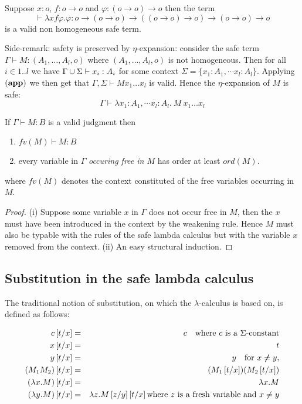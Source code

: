 \begin{exmp}
Suppose $x:o$, $f:o\rightarrow o$ and $\varphi:(o\rightarrow
o)\rightarrow o$ then the term $$\vdash \lambda x f \varphi .
\varphi : o \rightarrow (o\rightarrow o) \rightarrow ((o\rightarrow
o)\rightarrow o) \rightarrow (o\rightarrow o)\rightarrow o$$ is
a valid non homogeneous safe term.
\end{exmp}

Side-remark: safety is preserved by $\eta$-expansion: consider the safe term
$\Gamma \vdash M:(A_1,\ldots,A_l,o)$ where $(A_1,\ldots,A_l,o)$ is not homogeneous. Then for all $i \in 1..l$ we have $\Gamma \cup \Sigma \vdash x_i :A_i$ for some
context $\Sigma = \{ x_1:A_1, \cdots x_l :A_l \}$. Applying $\mathbf{(app)}$ we then get that $\Gamma, \Sigma \vdash M x_1 \ldots x_l$ is valid. Hence
the $\eta$-expansion of $M$ is safe:
$$\Gamma \vdash \lambda x_1:A_1, \cdots x_l:A_l .\ M\ x_1 \ldots x_l$$


\begin{lem}
\label{lem:nonhomosafe_basic_prop}
If $\Gamma \vdash M : B$ is a valid judgment then
\begin{enumerate}
\item $fv(M) \vdash M : B$
\item every variable in $\Gamma$ \emph{occuring free in $M$} has order at
least $ord(M)$.
\end{enumerate}
where $fv(M)$ denotes the context constituted of the free variables occurring in $M$.
\end{lem}
\begin{proof}
(i) Suppose some variable $x$ in $\Gamma$ does not occur free in $M$,
then the $x$ must have been introduced in the context by the weakening rule.
Hence $M$ must also be typable with the rules of the safe lambda calculus but with the variable $x$ removed from the context.
(ii) An easy structural induction.
\end{proof}


\subsection{Substitution in the safe lambda calculus}

The traditional notion of substitution, on which the
$\lambda$-calculus is based on, is defined as follows:
\begin{dfn}[Substitution]
\label{dfn:subst}
\begin{eqnarray*}
c \left[ t/x \right] &=& c \quad \mbox{where $c$ is a $\Sigma$-constant}\\
x \left[ t/x \right] &=& t\\
 y\left[ t/x \right] &=& y \quad \mbox{for } x \not \neq y,\\
(M_1 M_2) \left[ t/x \right] &=& (M_1 \left[ t/x \right]) (M_2 \left[ t/x \right])\\
(\lambda x . M) \left[ t/x \right] &=& \lambda x . M\\
(\lambda y . M) \left[ t/x \right] &=& \lambda z . M \left[ z/y \right]
\left[ t/x \right] \mbox{where $z$ is a fresh variable and $x\not = y$}
\end{eqnarray*}
\end{dfn}

